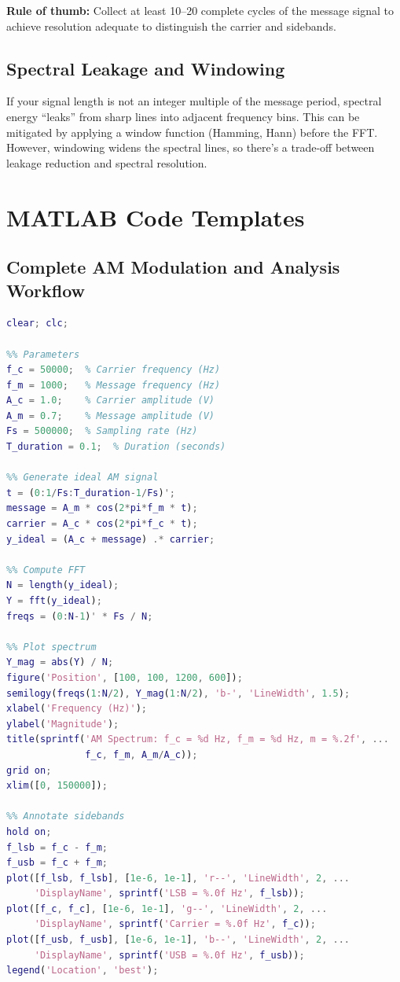 \documentclass[11pt,letterpaper]{article}
\begin{document}
\noindent
\textbf{Rule of thumb:} Collect at least 10--20 complete cycles of the message signal to achieve resolution adequate to distinguish the carrier and sidebands.

\subsection{Spectral Leakage and Windowing}

If your signal length is not an integer multiple of the message period, spectral energy ``leaks'' from sharp lines into adjacent frequency bins. This can be mitigated by applying a window function (Hamming, Hann) before the FFT. However, windowing widens the spectral lines, so there's a trade-off between leakage reduction and spectral resolution.

\section{MATLAB Code Templates}

\subsection{Complete AM Modulation and Analysis Workflow}

\begin{lstlisting}[language=MATLAB, basicstyle=\ttfamily\small]
%% Lab 11: AM Modulation Analysis
clear; clc;

%% Parameters
f_c = 50000;  % Carrier frequency (Hz)
f_m = 1000;   % Message frequency (Hz)
A_c = 1.0;    % Carrier amplitude (V)
A_m = 0.7;    % Message amplitude (V)
Fs = 500000;  % Sampling rate (Hz)
T_duration = 0.1;  % Duration (seconds)

%% Generate ideal AM signal
t = (0:1/Fs:T_duration-1/Fs)';
message = A_m * cos(2*pi*f_m * t);
carrier = A_c * cos(2*pi*f_c * t);
y_ideal = (A_c + message) .* carrier;

%% Compute FFT
N = length(y_ideal);
Y = fft(y_ideal);
freqs = (0:N-1)' * Fs / N;

%% Plot spectrum
Y_mag = abs(Y) / N;
figure('Position', [100, 100, 1200, 600]);
semilogy(freqs(1:N/2), Y_mag(1:N/2), 'b-', 'LineWidth', 1.5);
xlabel('Frequency (Hz)');
ylabel('Magnitude');
title(sprintf('AM Spectrum: f_c = %d Hz, f_m = %d Hz, m = %.2f', ...
              f_c, f_m, A_m/A_c));
grid on;
xlim([0, 150000]);

%% Annotate sidebands
hold on;
f_lsb = f_c - f_m;
f_usb = f_c + f_m;
plot([f_lsb, f_lsb], [1e-6, 1e-1], 'r--', 'LineWidth', 2, ...
     'DisplayName', sprintf('LSB = %.0f Hz', f_lsb));
plot([f_c, f_c], [1e-6, 1e-1], 'g--', 'LineWidth', 2, ...
     'DisplayName', sprintf('Carrier = %.0f Hz', f_c));
plot([f_usb, f_usb], [1e-6, 1e-1], 'b--', 'LineWidth', 2, ...
     'DisplayName', sprintf('USB = %.0f Hz', f_usb));
legend('Location', 'best');
\end{lstlisting}
\end{document}
